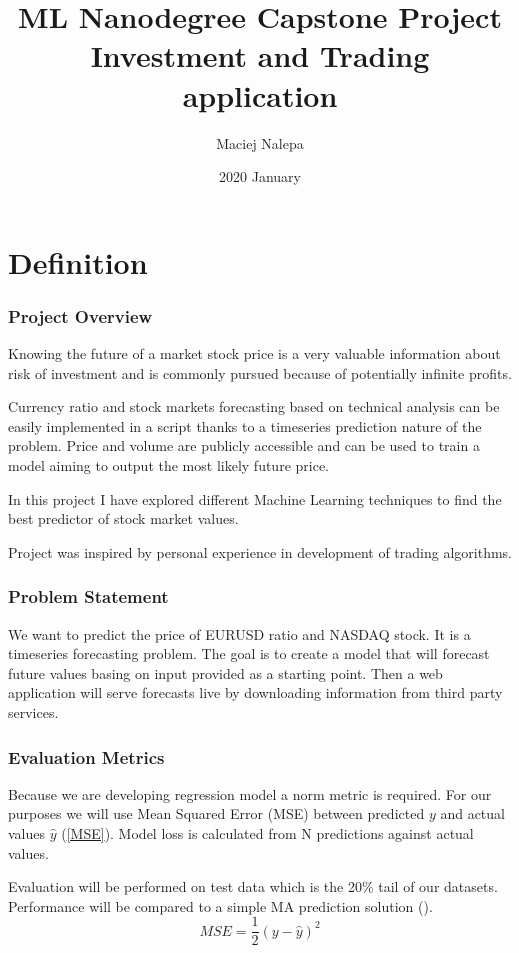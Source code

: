 \documentclass[a4paper,12pt]{article}
\title{ML Nanodegree Capstone Project\\Investment and Trading application}
\author{Maciej Nalepa}
\date{2020 January}
\begin{document}
\maketitle

\part{Definition}
\section*{Project Overview}
Knowing the future of a market stock price is a very valuable information about risk of investment and is commonly pursued because of potentially infinite profits.

Currency ratio and stock markets forecasting based on technical analysis can be easily implemented in a script thanks to a timeseries prediction nature of the problem. Price and volume are publicly accessible and can be used to train a model aiming to output the most likely future price.

In this project I have explored different Machine Learning techniques to find the best predictor of stock market values.

Project was inspired by personal experience in development of trading algorithms.

\section*{Problem Statement}
We want to predict the price of EURUSD ratio and NASDAQ stock. It is a timeseries forecasting problem. The goal is to create a model that will forecast future values basing on input provided as a starting point. Then a web application will serve forecasts live by downloading information from third party services.

\section*{Evaluation Metrics}
Because we are developing regression model a norm metric is required. For our purposes we will use Mean Squared Error (MSE) between predicted $y$ and actual values $\hat{y}$ (\ref{MSE}). Model loss is calculated from N predictions against actual values.

Evaluation will be performed on test data which is the 20\% tail of our datasets. Performance will be compared to a simple MA prediction solution (\cite{Vidhya}).
\begin{equation}
	\label{MSE}
	MSE = \frac{1}{2} \left( y - \hat{y} \right)^2
\end{equation}
\end{document}
